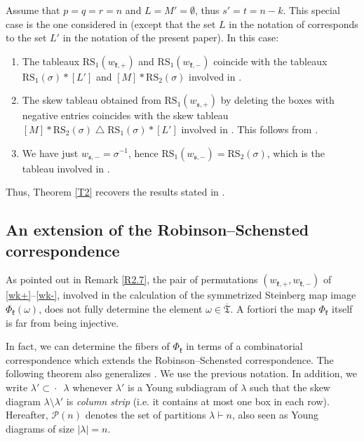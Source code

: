 \documentclass[ALCO,Unicode]{cedram}
\newcommand{\fk}{\mathfrak{k}}
\newcommand{\fs}{\mathfrak{s}}
\newcommand{\RS}{\mathrm{RS}}
\newcommand{\partitionsof}[1]{\mathcal{P}(#1)}
\newcommand{\ppermutationsof}{\mathfrak{T}}
\newcommand{\parameters}{\overline{\ppermutationsof}}
\newcommand{\columnstrip}{\subset\!\!\!\!\!\cdot\,\,\,}
\begin{document}
\begin{rema}
Assume that $p=q=r=n$ and $L=M'=\emptyset$, thus $s'=t=n-k$.
This special case is the one considered in \cite[\S9--10]{FN2} (except that the set $L$ in the notation of \cite[\S9--10]{FN2} corresponds to the set $L'$ in the notation of the present paper).
In this case:
\begin{enumerate}
\item The tableaux $\RS_1(w_{\fk,+})$ and $\RS_1(w_{\fk,-})$ coincide with the tableaux
$\RS_1(\sigma)*[L']$ and $[M]*\RS_2(\sigma)$
involved in \cite[Theorems 7.4, 9.1, and 10.4\,(1)]{FN2}.
\item The skew tableau obtained from $\RS_1(w_{\fs,+})$ by deleting the boxes with negative entries coincides with the skew tableau $[M]*\RS_2(\sigma)\bigtriangleup
\RS_1(\sigma)*[L']$ involved in \cite[Theorem 10.4\,(2)]{FN2}.
This follows from \cite[Lemma 10.9]{FN2}.
\item We have just $w_{\fs,-}=\sigma^{-1}$, hence $\RS_1(w_{\fs,-})=\RS_2(\sigma)$, which is the tableau involved in \cite[Theorem 10.4\,(3)]{FN2}.
\end{enumerate}
Thus, Theorem \ref{T2} recovers the results stated in \cite[Theorems 9.1 and 10.4]{FN2}.
\end{rema}

\subsection{An extension of the Robinson--Schensted correspondence}

\label{section-2.4}

As pointed out in Remark \ref{R2.7}, the pair of permutations $(w_{\fk,+},w_{\fk,-})$ of \eqref{wk+}--\eqref{wk-}, involved in the calculation of the symmetrized Steinberg map image $\Phi_\fk(\omega)$,
does not fully determine the element $\omega\in\parameters$.
A fortiori the map $\Phi_\fk$ itself is far from being injective.

In fact, we can determine the fibers of $\Phi_\fk$ in terms of a combinatorial correspondence which extends the Robinson--Schensted correspondence. The following theorem also generalizes \cite[Theorem 7.6]{FN2}.
We use the previous notation.
In addition, we write $\lambda'\columnstrip \lambda$ whenever $\lambda'$ is a Young subdiagram of $\lambda$ such that the skew diagram $\lambda\setminus\lambda'$ is {\em column strip} (i.e. it contains at most one box in each row).
Hereafter, $\partitionsof{n}$ denotes the set of partitions $\lambda\vdash n$, also seen as Young diagrams of size $|\lambda|=n$.
\end{document}

